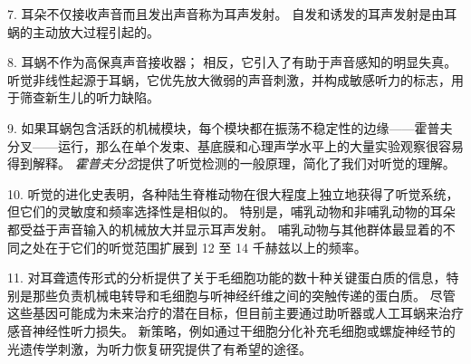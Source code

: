 7. 耳朵不仅接收声音而且发出声音称为耳声发射。
自发和诱发的耳声发射是由耳蜗的主动放大过程引起的。 


8. 耳蜗不作为高保真声音接收器；
相反，它引入了有助于声音感知的明显失真。
听觉非线性起源于耳蜗，它优先放大微弱的声音刺激，并构成敏感听力的标志，用于筛查新生儿的听力缺陷。


9. 如果耳蜗包含活跃的机械模块，每个模块都在振荡不稳定性的边缘——霍普夫分叉——运行，那么在单个发束、基底膜和心理声学水平上的大量实验观察很容易得到解释。
\textit{霍普夫分岔}提供了听觉检测的一般原理，简化了我们对听觉的理解。


10. 听觉的进化史表明，各种陆生脊椎动物在很大程度上独立地获得了听觉系统，但它们的灵敏度和频率选择性是相似的。
特别是，哺乳动物和非哺乳动物的耳朵都受益于声音输入的机械放大并显示耳声发射。
哺乳动物与其他群体最显着的不同之处在于它们的听觉范围扩展到 12 至 14 千赫兹以上的频率。


11. 对耳聋遗传形式的分析提供了关于毛细胞功能的数十种关键蛋白质的信息，特别是那些负责机械电转导和毛细胞与听神经纤维之间的突触传递的蛋白质。
尽管这些基因可能成为未来治疗的潜在目标，但目前主要通过助听器或人工耳蜗来治疗感音神经性听力损失。
新策略，例如通过干细胞分化补充毛细胞或螺旋神经节的光遗传学刺激，为听力恢复研究提供了有希望的途径。



